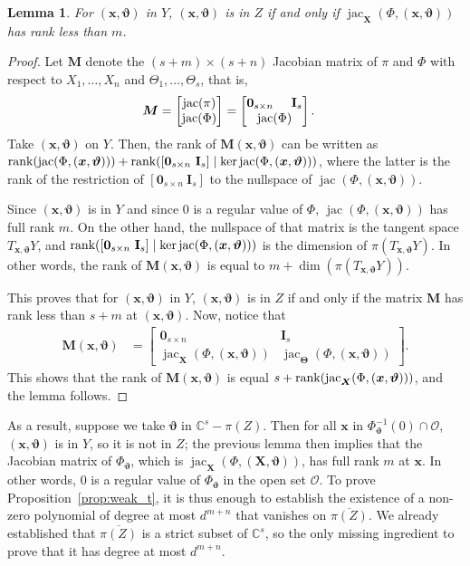 \documentclass[12pt]{article}
\def\sO{\mathscr{O}}
\def\thetab{\bm{\vartheta}}
\def\xb{{\bm x}}
\DeclareMathOperator{\jac}{jac}
\def\dt{s}
\def\C{\mathbb{C}}
\def\bbm{\begin{bmatrix}}
\def\ebm{\end{bmatrix}}
\newtheorem{lemma}[theorem]{Lemma}
\begin{document}
\begin{lemma}\label{prop:rankJ}
  For $(\xb,\thetab)$ in $Y$, $(\xb,\thetab)$ is in $Z$ if and only if
  $\jac_{\bm X}(\Phi,(\xb,\thetab))$ has rank less than $m$.
\end{lemma}
\begin{proof}
  Let $\bm M$ denote the $(s+m) \times (s+n)$ Jacobian matrix of $\pi$
  and $\Phi$ with respect to $X_1,\dots,X_n$ and
  $\Theta_1,\dots,\Theta_s$, that is,
  \begin{align*}
    \bm M &= 
    \bbm 
    \jac(\pi)\\
    \jac(\Phi) 
    \ebm 
    =
    \bbm 
    \textbf{0}_{\dt \times n}\hspace{5mm}\textbf{I}_{\dt} \\
    \jac(\Phi)
    \ebm.
  \end{align*}
  Take $(\xb,\thetab)$ on $Y$. Then, the rank of $\bm M(\xb,\thetab)$
  can be written as $\textup{rank}(\jac(\Phi,(\xb,\thetab))) +
  \textup{rank}([\textbf{0}_{\dt \times n}~\textbf{I}_{\dt}] \mid \ker
   \jac(\Phi,(\xb,\thetab)))$, where the latter is the rank of the
  restriction of $[\textbf{0}_{\dt \times n}~\textbf{I}_{\dt}]$ to the
  nullspace of $\jac(\Phi,(\xb,\thetab))$.

  Since $(\xb,\thetab)$ is in $Y$ and since $0$ is a regular value of
  $\Phi$, $\jac (\Phi,(\xb,\thetab))$ has full rank $m$. On the other
  hand, the nullspace of that matrix is the tangent space
  $T_{\xb,\thetab} Y$, and $\textup{rank}([\textbf{0}_{\dt \times
      n}~\textbf{I}_{\dt}] \mid \ker \jac(\Phi,(\xb,\thetab)))$ is the
  dimension of $\pi(T_{\xb,\thetab} Y)$.  In other words, the rank of
  $\bm M(\xb,\thetab)$ is equal to $m+\dim(\pi(T_{\xb,\thetab} Y))$.

  This proves that for $(\xb,\thetab)$ in $Y$, $(\xb,\thetab)$ is in
  $Z$ if and only if the matrix $\bm M$ has rank less than $\dt+m$ at
  $(\xb,\thetab)$. Now, notice that
  \begin{align*}
   \bm M(\xb,\thetab)&= 
    \bbm 
    \textbf{0}_{\dt \times n} &\textbf{I}_{\dt} \\
     \jac_{\bm X}(\Phi,(\xb,\thetab))     &\jac_{\bm \Theta}(\Phi, (\xb,\thetab))
    \ebm.
  \end{align*}
  This shows that the rank of $\bm M(\xb,\thetab)$ 
  is equal $s + \textup{rank}(\jac_{\bm X}(\Phi,(\xb,\thetab)))$,
  and  the lemma follows.
\end{proof}

As a result, suppose we take $\thetab$ in $\C^\dt - {\pi(Z)}$.  Then
for all $\xb$ in $\Phi_{\thetab}^{-1}(0) \cap \sO$, $(\xb,\thetab)$ is
in $Y$, so it is not in $Z$; the previous lemma then implies that the
Jacobian matrix of $\Phi_{\thetab}$, which is $\jac_{\bm X}(\Phi,(\bm
X,\thetab))$, has full rank $m$ at $\xb$. In other words, $0$ is a
regular value of $\Phi_{\thetab}$ in the open set $\sO$. To prove
Proposition~\ref{prop:weak_t}, it is thus enough to establish the
existence of a non-zero polynomial of degree at most $d^{m+n}$ that
vanishes on $\overline{\pi(Z)}$. We already established that
$\overline{\pi(Z)}$ is a strict subset of $\C^\dt$, so the only
missing ingredient to prove that it has degree at most $d^{m+n}$.
\end{document}
